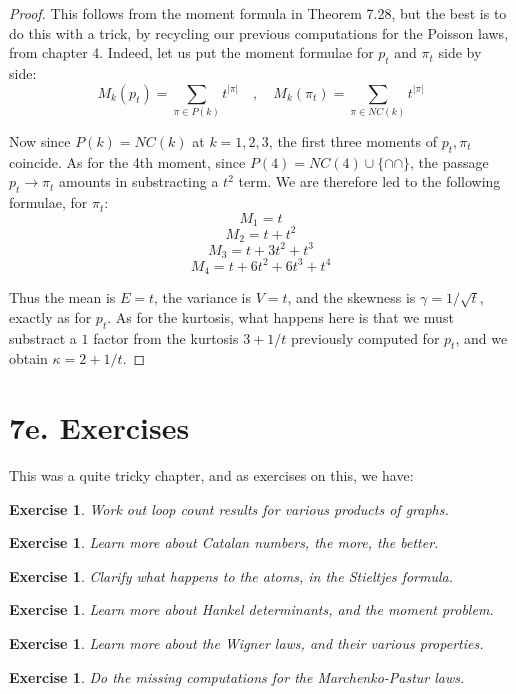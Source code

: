 \documentclass[12pt]{amsbook}
\newtheorem{exercise}[theorem]{Exercise}
\begin{document}
\begin{proof}
This follows from the moment formula in Theorem 7.28, but the best is to do this with a trick, by recycling our previous computations for the Poisson laws, from chapter 4. Indeed, let us put the moment formulae for $p_t$ and $\pi_t$ side by side:
$$M_k(p_t)=\sum_{\pi\in P(k)}t^{|\pi|}\quad,\quad 
M_k(\pi_t)=\sum_{\pi\in NC(k)}t^{|\pi|}$$

Now since $P(k)=NC(k)$ at $k=1,2,3$, the first three moments of $p_t,\pi_t$ coincide. As for the 4th moment, since $P(4)=NC(4)\cup\{\cap\!\!\cap\}$, the passage $p_t\to\pi_t$ amounts in substracting a $t^2$ term. We are therefore led to the following formulae, for $\pi_t$:
$$M_1=t$$
$$M_2=t+t^2$$
$$M_3=t+3t^2+t^3$$
$$M_4=t+6t^2+6t^3+t^4$$

Thus the mean is $E=t$, the variance is $V=t$, and the skewness is $\gamma=1/\sqrt{t}$, exactly as for $p_t$. As for the kurtosis, what happens here is that we must substract a $1$ factor from the kurtosis $3+1/t$ previously computed for $p_t$, and we obtain $\kappa=2+1/t$.
\end{proof}

\section*{7e. Exercises}

This was a quite tricky chapter, and as exercises on this, we have:

\begin{exercise}
Work out loop count results for various products of graphs.
\end{exercise}

\begin{exercise}
Learn more about Catalan numbers, the more, the better.
\end{exercise}

\begin{exercise}
Clarify what happens to the atoms, in the Stieltjes formula.
\end{exercise}

\begin{exercise}
Learn more about Hankel determinants, and the moment problem.
\end{exercise}

\begin{exercise}
Learn more about the Wigner laws, and their various properties.
\end{exercise}

\begin{exercise}
Do the missing computations for the Marchenko-Pastur laws.
\end{exercise}
\end{document}
